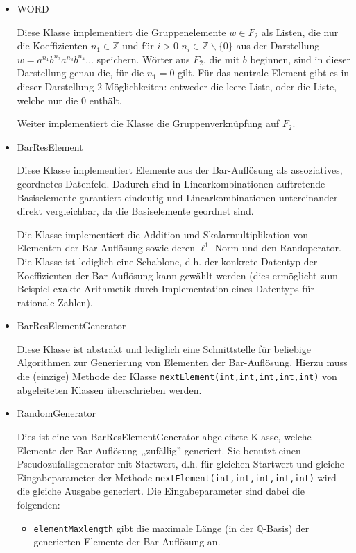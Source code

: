 \documentclass[a4paper,twoside,10pt]{scrreprt}
\newcommand{\Z}{\mathbb{Z}}
\newcommand{\Q}{\mathbb{Q}}
\theoremstyle{definition}
\begin{document}
\begin{itemize}
\item WORD\par
Diese Klasse implementiert die Gruppenelemente $w\in F_2$ als Listen, die nur die Koeffizienten $n_1\in \Z$ und für $i>0$ $n_i\in \Z\backslash\{0\}$ aus der Darstellung $w=a^{n_1}b^{n_2}a^{n_3}b^{n_4}\ldots$ speichern. Wörter aus $F_2$, die mit $b$ beginnen, sind in dieser Darstellung genau die, für die $n_1=0$ gilt. Für das neutrale Element gibt es in dieser Darstellung 2 Möglichkeiten: entweder die leere Liste, oder die Liste, welche nur die $0$ enthält.\par
Weiter implementiert die Klasse die Gruppenverknüpfung auf $F_2$.
\item BarResElement\par
Diese Klasse implementiert Elemente aus der Bar-Auflösung als assoziatives, geordnetes Datenfeld. Dadurch sind in Linearkombinationen auftretende Basiselemente garantiert eindeutig und Linearkombinationen untereinander direkt vergleichbar, da die Basiselemente geordnet sind.\par
Die Klasse implementiert die Addition und Skalarmultiplikation von Elementen der Bar-Auflösung sowie deren $\ell^1$-Norm und den Randoperator. Die Klasse ist lediglich eine Schablone, d.h. der konkrete Datentyp der Koeffizienten der Bar-Auflösung kann gewählt werden (dies ermöglicht zum Beispiel exakte Arithmetik durch Implementation eines Datentyps für rationale Zahlen).
\item BarResElementGenerator\par
Diese Klasse ist abstrakt und lediglich eine Schnittstelle für beliebige Algorithmen zur Generierung von Elementen der Bar-Auflösung. Hierzu muss die (einzige) Methode der Klasse \lstinline|nextElement(int,int,int,int,int)| von abgeleiteten Klassen überschrieben werden.
\item RandomGenerator\par
Dies ist eine von BarResElementGenerator abgeleitete Klasse, welche Elemente der Bar-Auflösung ,,zufällig'' generiert. Sie benutzt einen Pseudozufallsgenerator mit Startwert, d.h. für gleichen Startwert und gleiche Eingabeparameter der Methode \lstinline|nextElement(int,int,int,int,int)| wird die gleiche Ausgabe generiert. Die Eingabeparameter sind dabei die folgenden:
\begin{itemize}
\item \lstinline|elementMaxlength| gibt die maximale Länge (in der $\Q$-Basis) der generierten Elemente der Bar-Auflösung an.

\end{itemize}
\end{itemize}
\end{document}
